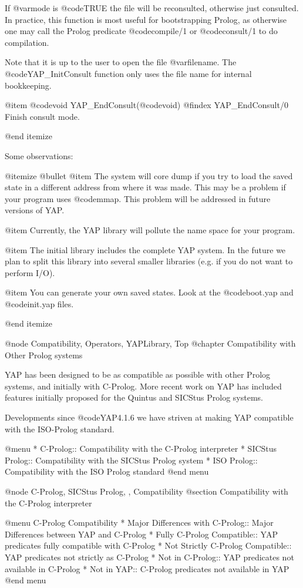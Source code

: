 {{{{{{{{{If @var{mode} is @code{TRUE} the file will be reconsulted, otherwise
just consulted. In practice, this function is most useful for
bootstrapping Prolog, as otherwise one may call the Prolog predicate
@code{compile/1} or @code{consult/1} to do compilation.

Note that it is up to the user to open the file @var{filename}. The
@code{YAP_InitConsult} function only uses the file name for internal
bookkeeping.

@item  @code{void} YAP_EndConsult(@code{void})
@findex YAP_EndConsult/0
Finish consult mode.

@end itemize

Some observations:

@itemize @bullet
@item The system will core dump if you try to load the saved state in a
different address from where it was made. This may be a problem if
your program uses @code{mmap}. This problem will be addressed in future
versions of YAP.

@item Currently, the YAP library will pollute the name
space for your program.

@item The initial library includes the complete YAP system. In
the future we plan to split this library into several smaller libraries
(e.g. if you do not want to perform I/O).

@item You can generate your own saved states. Look at  the
@code{boot.yap} and @code{init.yap} files.

@end itemize

@node Compatibility, Operators, YAPLibrary, Top
@chapter Compatibility with Other Prolog systems

YAP has been designed to be as compatible as possible with
other Prolog systems, and initially with C-Prolog. More recent work on
YAP has included features initially proposed for the Quintus
and SICStus Prolog systems.

Developments since @code{YAP4.1.6} we have striven at making
YAP compatible with the ISO-Prolog standard. 

@menu
* C-Prolog:: Compatibility with the C-Prolog interpreter
* SICStus Prolog:: Compatibility with the SICStus Prolog system
* ISO Prolog::  Compatibility with the ISO Prolog standard
@end menu

@node C-Prolog, SICStus Prolog, , Compatibility
@section Compatibility with the C-Prolog interpreter

@menu
C-Prolog Compatibility
* Major Differences with C-Prolog:: Major Differences between YAP and C-Prolog
* Fully C-Prolog Compatible:: YAP predicates fully compatible with
C-Prolog
* Not Strictly C-Prolog Compatible:: YAP predicates not strictly as C-Prolog
* Not in C-Prolog:: YAP predicates not available in C-Prolog
* Not in YAP:: C-Prolog predicates not available in YAP
@end menu

}}}}}}}}}
